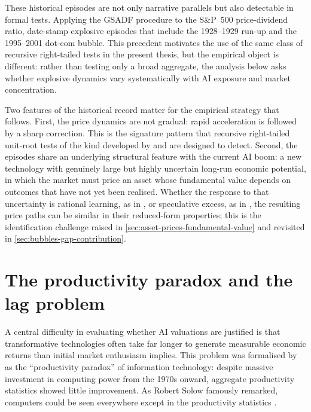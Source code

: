 These historical episodes are not only narrative parallels but also detectable in formal tests. Applying the GSADF procedure to the S\&P~500 price-dividend ratio, \citet{phillipsShiYu2015a} date-stamp explosive episodes that include the 1928--1929 run-up and the 1995--2001 dot-com bubble. This precedent motivates the use of the same class of recursive right-tailed tests in the present thesis, but the empirical object is different: rather than testing only a broad aggregate, the analysis below asks whether explosive dynamics vary systematically with AI exposure and market concentration.

Two features of the historical record matter for the empirical strategy that follows. First, the price dynamics are not gradual: rapid acceleration is followed by a sharp correction. This is the signature pattern that recursive right-tailed unit-root tests of the kind developed by \citet{phillipsWuYu2011} and \citet{phillipsShiYu2015a} are designed to detect. Second, the episodes share an underlying structural feature with the current AI boom: a new technology with genuinely large but highly uncertain long-run economic potential, in which the market must price an asset whose fundamental value depends on outcomes that have not yet been realised. Whether the response to that uncertainty is rational learning, as in \citet{pastorVeronesi2009}, or speculative excess, as in \citet{shiller2000}, the resulting price paths can be similar in their reduced-form properties; this is the identification challenge raised in \cref{sec:asset-prices-fundamental-value} and revisited in \cref{sec:bubbles-gap-contribution}.

\section{The productivity paradox and the lag problem}
\label{sec:productivity-paradox}

A central difficulty in evaluating whether AI valuations are justified is that transformative technologies often take far longer to generate measurable economic returns than initial market enthusiasm implies. This problem was formalised by \citet{brynjolfsson1993} as the ``productivity paradox'' of information technology: despite massive investment in computing power from the 1970s onward, aggregate productivity statistics showed little improvement. As Robert Solow famously remarked, computers could be seen everywhere except in the productivity statistics \citep{brynjolfsson1993}.

